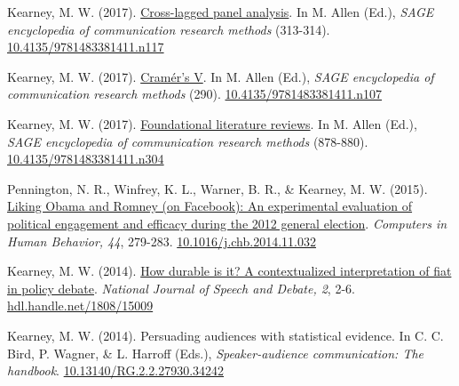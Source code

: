 \begin{bibenum}
\item[] Kearney, M. W. (2017).
\href{http://mikewk.com/clpm.pdf}{Cross-lagged panel analysis}.
In M. Allen (Ed.),
\textit{SAGE encyclopedia of communication research methods} (313-314).
\href{http://dx.doi.org/10.4135/9781483381411.n117}{10.4135/9781483381411.n117}

\item[] Kearney, M. W. (2017).
\href{http://mikewk.com/cramersv.pdf}{Cram\'{e}r's V}.
In M. Allen (Ed.),
\textit{SAGE encyclopedia of communication research methods} (290).
\href{http://dx.doi.org/10.4135/9781483381411.n107}{10.4135/9781483381411.n107}

\item[] Kearney, M. W. (2017).
\href{http://mikewk.com/flr.pdf}{Foundational literature reviews}.
In M. Allen (Ed.),
\textit{SAGE encyclopedia of communication research methods} (878-880).
\href{http://dx.doi.org/10.4135/9781483381411.n304}{10.4135/9781483381411.n304}

\item Pennington, N. R., Winfrey, K. L., Warner, B. R., \& Kearney, M. W. (2015).
\href{http://www.researchgate.net/publication/269728178_Liking_Obama_and_Romney_(on_Facebook)_An_experimental_evaluation_of_political_engagement_and_efficacy_during_the_2012_general_election}{Liking Obama and Romney (on Facebook): An experimental evaluation of political engagement and efficacy during the 2012 general election}.
\textit{Computers in Human Behavior, 44}, 279-283.
\href{https://doi.org/10.1016/j.chb.2014.11.032}{10.1016/j.chb.2014.11.032}

\item Kearney, M. W. (2014).
\href{http://ssrn.com/abstract=2618298}{How durable is it? A contextualized interpretation of fiat in policy debate}.
\textit{National Journal of Speech and Debate, 2}, 2-6.
\href{http://hdl.handle.net/1808/15009}{hdl.handle.net/1808/15009}

\item Kearney, M. W. (2014). Persuading audiences with statistical evidence.
In C. C. Bird, P. Wagner, \& L. Harroff (Eds.),
\textit{Speaker-audience communication: The handbook}.
\href{https://dx.doi.org/10.13140/RG.2.2.27930.34242}{10.13140/RG.2.2.27930.34242}

\end{bibenum}
